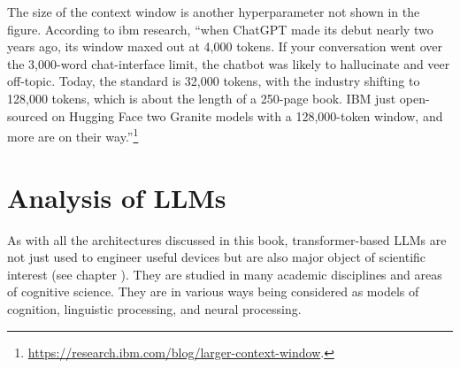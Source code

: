 The size of the context window is another hyperparameter not shown in the figure. According to ibm research, ``when ChatGPT made its debut nearly two years ago, its window maxed out at 4,000 tokens. If your conversation went over the 3,000-word chat-interface limit, the chatbot was likely to hallucinate and veer off-topic. Today, the standard is 32,000 tokens, with the industry shifting to 128,000 tokens, which is about the length of a 250-page book. IBM just open-sourced on Hugging Face two Granite models with a 128,000-token window, and more are on their way.''\footnote{\url{https://research.ibm.com/blog/larger-context-window}.}



%
%
% 
%
%
%
%

\section{Analysis of LLMs}\label{llm_analsis}

As with all the architectures discussed in this book, transformer-based LLMs are not just used to engineer useful devices but are also major object of scientific interest (see chapter ). They are studied in many academic disciplines and areas of cognitive science. They are in various ways being considered as models of cognition, linguistic processing, and neural processing. 

